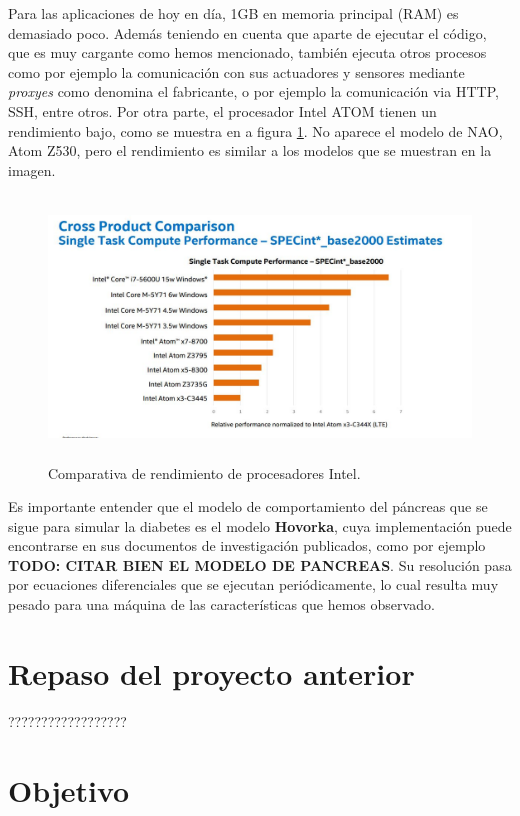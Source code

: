 \documentclass[12pt,spanish,listoffigures,listoftables]{tfgetsinf}
\begin{document}
Para las aplicaciones de hoy en día, 1GB en memoria principal (RAM) es demasiado poco. Además teniendo en cuenta que aparte de ejecutar el código, que es muy cargante como hemos mencionado, también ejecuta otros procesos como por ejemplo la comunicación con sus actuadores y sensores mediante \textit{proxyes} como denomina el fabricante, o por ejemplo la comunicación via HTTP, SSH, entre otros. Por otra parte, el procesador Intel ATOM tienen un rendimiento bajo, como se muestra en a figura \ref{figura:IntelAtom}. No aparece el modelo de NAO, Atom Z530, pero el rendimiento es similar a los modelos que se muestran en la imagen. \\

\begin{figure}[!h]
	\centering
	\includegraphics[height=7cm]{img/IntelAtom}
	\caption{Comparativa de rendimiento de procesadores Intel.}
	\label{figura:IntelAtom}
\end{figure}

Es importante entender que el modelo de comportamiento del páncreas que se sigue para simular la diabetes es el modelo \textbf{Hovorka}, cuya implementación puede encontrarse en sus documentos de investigación publicados, como por ejemplo \textbf{TODO: CITAR BIEN EL MODELO DE PANCREAS}. Su resolución pasa por ecuaciones diferenciales que se ejecutan periódicamente, lo cual resulta muy pesado para una máquina de las características que hemos observado.

\section{Repaso del proyecto anterior}

??????????????????

\section{Objetivo}
\end{document}
